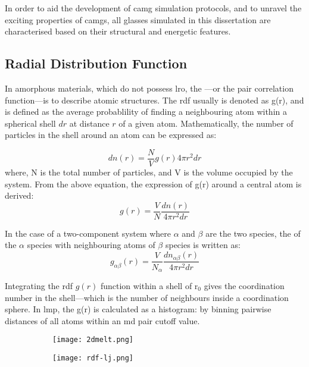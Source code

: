 In order to aid the development of \gls{camg} simulation protocols, and to unravel the exciting properties of \gls{camg}s, all glasses simulated in this dissertation are characterised based on their structural and energetic features. \par %

\subsection{Radial Distribution Function} \label{s:rdf}
In amorphous materials, which do not possess \gls{lro}, the ---or the pair correlation function---is to describe atomic structures. The \gls{rdf} usually is denoted as g(r), and is defined as the average probablility of finding a neighbouring atom within a spherical shell $dr$ at distance $r$ of a given atom. Mathematically, the number of particles in the shell around an atom can be expressed as:

\begin{equation}
dn(r) = \frac{N}{V} g(r) 4\pi r^2dr
\end{equation}
where, N is the total number of particles, and V is the volume occupied by the system. From the above equation, the expression of g(r) around a central atom is derived:
\begin{equation}
g(r) = \frac{V}{N} \frac{dn(r)}{4 \pi r^{2}dr}
\end{equation}

In the case of a two-component system where $\alpha$ and $\beta$ are the two species, the  of the $\alpha$ species with neighbouring atoms of $\beta$ species is written as: 
\begin{equation}
g_{\alpha \beta}(r) = \frac{V}{N_\alpha} \frac{dn_{\alpha \beta}(r)}{4 \pi r^{2}dr}
\end{equation}

Integrating the \gls{rdf} $g(r)$ function within a shell of r$_0$ gives the coordination number in the shell---which is the number of neighbours inside a coordination sphere. In \gls{lmp}, the g(r) is calculated as a histogram: by binning pairwise distances of all atoms within an \gls{md} pair cutoff value. \par

\begin{figure}[h]
	\begin{subfigure}{0.5\textwidth} \centering
		\texttt{[image: 2dmelt.png]}
		\subcaption{}
	\end{subfigure}%
	\hfill
	\begin{subfigure}{0.5\textwidth} \centering
		\texttt{[image: rdf-lj.png]}
		\subcaption{}
	\end{subfigure}%
	\label{f:ljrdf}
\end{figure}

